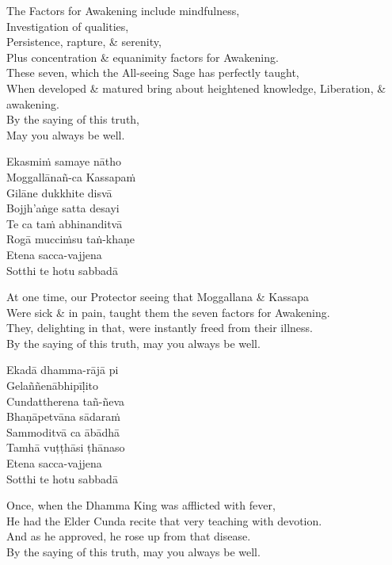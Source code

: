 \begin{english}
  The Factors for Awakening include mindfulness,\\
  Investigation of qualities,\\
  Persistence, rapture, \& serenity,\\
  Plus concentration \& equanimity factors for Awakening.\\
  These seven, which the All-seeing Sage has perfectly taught,\\
  When developed \& matured bring about heightened knowledge, Liberation, \& awakening.\\
  By the saying of this truth,\\
  May you always be well.
\end{english}

Ekasmiṁ samaye nātho\\
Moggallānañ-ca Kassapaṁ\\
Gilāne dukkhite disvā\\
Bojjh'aṅge satta desayi\\
Te ca taṁ abhinanditvā\\
Rogā mucciṁsu taṅ-khaṇe\\
Etena sacca-vajjena\\
Sotthi te hotu sabbadā

\begin{english}
  At one time, our Protector seeing that Moggallana \& Kassapa\\
  Were sick \& in pain, taught them the seven factors for Awakening.\\
  They, delighting in that, were instantly freed from their illness.\\
  By the saying of this truth, may you always be well.
\end{english}

Ekadā dhamma-rājā pi\\
Gelaññenābhipīḷito\\
Cundattherena tañ-ñeva\\
Bhaṇāpetvāna sādaraṁ\\
Sammoditvā ca ābādhā\\
Tamhā vuṭṭhāsi ṭhānaso\\
Etena sacca-vajjena\\
Sotthi te hotu sabbadā

\begin{english}
  Once, when the Dhamma King was afflicted with fever,\\
  He had the Elder Cunda recite that very teaching with devotion.\\
  And as he approved, he rose up from that disease.\\
  By the saying of this truth, may you always be well.
\end{english}

